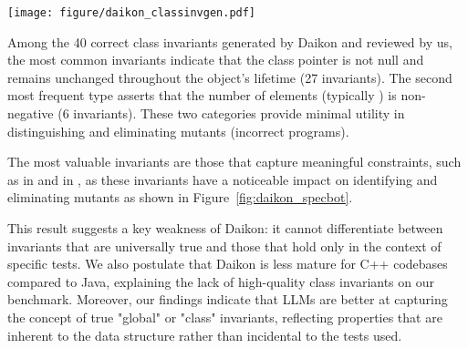 \label{daikon_compare}
\begin{figure*}[t]
    \centering
    \texttt{[image: figure/daikon\_classinvgen.pdf]}  %
    \caption{Daikon vs. \tech Kills}
    \label{fig:daikon_specbot}
\end{figure*}


Among the 40 correct class invariants generated by Daikon and reviewed by us, the most common invariants indicate that the class pointer is not null and remains unchanged throughout the object’s lifetime (27 invariants). The second most frequent type asserts that the number of elements (typically ) is non-negative (6 invariants). These two categories provide minimal utility in distinguishing and eliminating mutants (incorrect programs). 

The most valuable invariants are those that capture meaningful constraints, such as  in  and  in , as these invariants have a noticeable impact on identifying and eliminating mutants as shown in Figure~\ref{fig:daikon_specbot}.

This result suggests a key weakness of Daikon: it cannot differentiate between invariants that are universally true and those that hold only in the context of specific tests. We also postulate that Daikon is less mature for C++ codebases compared to Java, explaining the lack of high-quality class invariants on our benchmark.
Moreover, our findings indicate that LLMs are better at capturing the concept of true "global" or "class" invariants, reflecting properties that are inherent to the data structure rather than incidental to the tests used.




